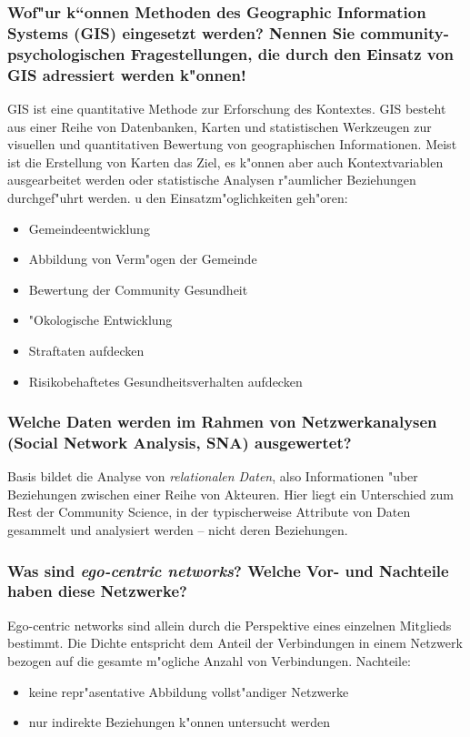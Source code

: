 \subsubsection{Wof"ur k“onnen Methoden des Geographic Information Systems (GIS) eingesetzt werden? Nennen Sie community-psychologischen Fragestellungen, die durch den Einsatz von GIS adressiert werden k"onnen!}
GIS ist eine quantitative Methode zur Erforschung des Kontextes.  GIS besteht aus einer Reihe von Datenbanken, Karten und statistischen Werkzeugen zur visuellen und quantitativen Bewertung von geographischen Informationen. Meist ist die Erstellung von Karten das Ziel, es k"onnen aber auch Kontextvariablen ausgearbeitet werden oder statistische Analysen r"aumlicher Beziehungen durchgef"uhrt werden. u den Einsatzm"oglichkeiten geh"oren:
\begin{itemize}
  \item Gemeindeentwicklung
  \item Abbildung von Verm"ogen der Gemeinde
  \item Bewertung der Community Gesundheit
  \item "Okologische Entwicklung
  \item Straftaten aufdecken
  \item Risikobehaftetes Gesundheitsverhalten aufdecken
\end{itemize}

\subsubsection{Welche Daten werden im Rahmen von Netzwerkanalysen (Social Network Analysis, SNA) ausgewertet?}
Basis bildet die Analyse von \emph{relationalen Daten}, also Informationen "uber Beziehungen zwischen einer Reihe von Akteuren. Hier liegt ein Unterschied zum Rest der Community Science, in der typischerweise Attribute von Daten gesammelt und analysiert werden – nicht deren Beziehungen.

\subsubsection{Was sind \emph{ego-centric networks}? Welche Vor- und Nachteile haben diese Netzwerke?}
Ego-centric networks sind allein durch die Perspektive eines einzelnen Mitglieds bestimmt. Die Dichte entspricht dem Anteil der Verbindungen in einem Netzwerk bezogen auf die gesamte m"ogliche Anzahl von Verbindungen.
Nachteile:\\
\begin{itemize}
  \item keine repr"asentative Abbildung vollst"andiger Netzwerke
  \item nur indirekte Beziehungen k"onnen untersucht werden
\end{itemize}

